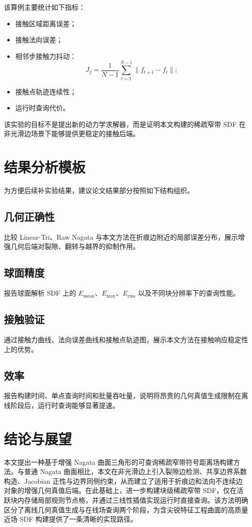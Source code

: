 \documentclass[11pt,a4paper]{ctexart}
\begin{document}
该算例主要统计如下指标：
\begin{itemize}[leftmargin=2em]
    \item 接触区域距离误差；
    \item 接触法向误差；
    \item 相邻步接触力抖动：
    \[
    J_f=\frac{1}{N-1}\sum_{t=1}^{N-1}\|f_{t+1}-f_t\|;
    \]
    \item 接触点轨迹连续性；
    \item 运行时查询代价。
\end{itemize}

该实验的目标不是提出新的动力学求解器，而是证明本文构建的稀疏窄带 SDF 在非光滑边场景下能够提供更稳定的接触后端。

\section{结果分析模板}

为方便后续补实验结果，建议论文结果部分按照如下结构组织。

\subsection{几何正确性}
比较 Linear-Tri、Raw Nagata 与本文方法在折痕边附近的局部误差分布，展示增强几何后端对裂隙、翻转与越界的抑制作用。

\subsection{球面精度}
报告球面解析 SDF 上的 $E_{\mathrm{mean}}$、$E_{\max}$、$E_{\mathrm{rms}}$ 以及不同块分辨率下的查询性能。

\subsection{接触验证}
通过接触力曲线、法向误差曲线和接触点轨迹图，展示本文方法在接触响应稳定性上的优势。

\subsection{效率}
报告构建时间、单点查询时间和批量吞吐量，说明将昂贵的几何真值生成限制在离线阶段后，运行时查询能够显著提速。

\section{结论与展望}

本文提出一种基于增强 Nagata 曲面三角形的可查询稀疏窄带符号距离场构建方法。与普通 Nagata 曲面相比，本文在非光滑边上引入裂隙边检测、共享边界系数构造、Jacobian 正性与边界同侧约束，从而建立了适用于折痕边和法向不连续边对象的增强几何真值后端。在此基础上，进一步构建块级稀疏窄带 SDF，仅在活跃块内存储局部规则节点格，并通过三线性插值实现运行时直接查询。该方法明确区分了离线几何真值生成与在线场查询两个阶段，为含尖锐特征工程曲面的高质量近场 SDF 构建提供了一条清晰的实现路径。
\end{document}
